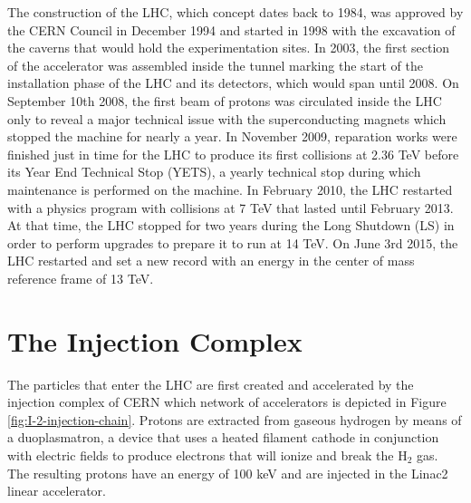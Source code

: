   The construction of the LHC, which concept dates back to 1984, was approved by the CERN Council in December 1994 and started in 1998 with the excavation of the caverns that would hold the experimentation sites. In 2003, the first section of the accelerator was assembled inside the tunnel marking the start of the installation phase of the LHC and its detectors, which would span until 2008. On September 10th 2008, the first beam of protons was circulated inside the LHC only to reveal a major technical issue with the superconducting magnets which stopped the machine for nearly a year. In November 2009, reparation works were finished just in time for the LHC to produce its first collisions at 2.36 TeV before its Year End Technical Stop (YETS), a yearly technical stop during which maintenance is performed on the machine. In February 2010, the LHC restarted with a physics program with collisions at 7 TeV that lasted until February 2013. At that time, the LHC stopped for two years during the Long Shutdown (LS) in order to perform upgrades to prepare it to run at 14 TeV. On June 3rd 2015, the LHC restarted and set a new record with an energy in the center of mass reference frame of 13 TeV.

  \section{The Injection Complex}

    The particles that enter the LHC are first created and accelerated by the injection complex of CERN which network of accelerators is depicted in Figure \ref{fig:I-2-injection-chain}. Protons are extracted from gaseous hydrogen by means of a duoplasmatron, a device that uses a heated filament cathode in conjunction with electric fields to produce electrons that will ionize and break the H$_2$ gas. The resulting protons have an energy of 100 keV and are injected in the Linac2 linear accelerator. \\


